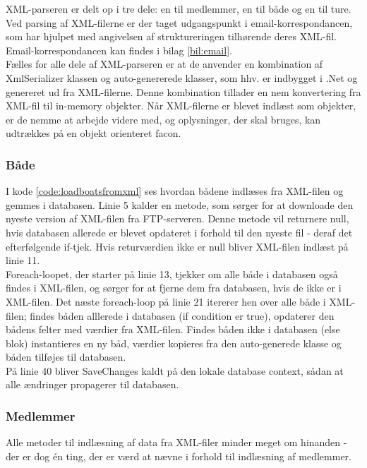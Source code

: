 XML-parseren er delt op i tre dele: en til medlemmer, en til både og en til ture. Ved parsing af XML-filerne er der taget udgangspunkt i email-korrespondancen, som har hjulpet med angivelsen af struktureringen tilhørende deres XML-fil. Email-korrespondancen kan findes i bilag \ref{bil:email}.\\

Fælles for alle dele af XML-parseren er at de anvender en kombination af XmlSerializer klassen og auto-genererede klasser, som hhv. er indbygget i .Net og genereret ud fra XML-filerne. Denne kombination tillader en nem konvertering fra XML-fil til in-memory objekter. Når XML-filerne er blevet indlæst som objekter, er de nemme at arbejde videre med, og oplysninger, der skal bruges, kan udtrækkes på en objekt orienteret facon.

\subsubsection*{Både}


I kode \ref{code:loadboatsfromxml} ses hvordan bådene indlæses fra XML-filen og gemmes i databasen. Linie 5 kalder en metode, som sørger for at downloade den nyeste version af XML-filen fra FTP-serveren. Denne metode vil returnere null, hvis databasen allerede er blevet opdateret i forhold til den nyeste fil - deraf det efterfølgende if-tjek. Hvis returværdien ikke er null bliver XML-filen indlæst på linie 11.\\

Foreach-loopet, der starter på linie 13, tjekker om alle både i databasen også findes i XML-filen, og sørger for at fjerne dem fra databasen, hvis de ikke er i XML-filen. Det næste foreach-loop på linie 21 itererer hen over alle både i XML-filen; findes båden alllerede i databasen (if condition er true), opdaterer den bådens felter med værdier fra XML-filen. Findes båden ikke i databasen (else blok) instantieres en ny båd, værdier kopieres fra den auto-generede klasse og båden tilføjes til databasen.\\

På linie 40 bliver SaveChanges kaldt på den lokale database context, sådan at alle ændringer propagerer til databasen.

\subsubsection*{Medlemmer}
Alle metoder til indlæsning af data fra XML-filer minder meget om hinanden - der er dog én ting, der er værd at nævne i forhold til indlæsning af medlemmer.


